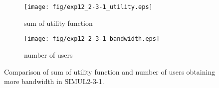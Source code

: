 \begin{figure}
	\begin{center}
		\begin{subfigure}[b]{0.8\textwidth}
			\centering
			\texttt{[image: fig/exp12\_2-3-1\_utility.eps]}
			\caption{sum of utility function}
			\label{figure:simul2_3_1_u_a}
		\end{subfigure}
		\begin{subfigure}[b]{0.8\textwidth}
			\centering
			\texttt{[image: fig/exp12\_2-3-1\_bandwidth.eps]}
			\caption{number of users}
			\label{figure:simul2_3_1_u_b}
		\end{subfigure}
		\caption{Comparison of sum of utility function and number of users obtaining more bandwidth in SIMUL2-3-1.}
		\label{figure:simul2_3_1_u}
	\end{center}
\end{figure}

\clearpage


